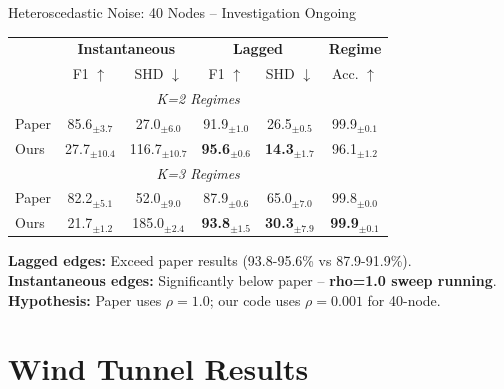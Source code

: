 \documentclass[aspectratio=169]{beamer}
\begin{document}
\begin{frame}{Heteroscedastic Noise: 40 Nodes -- \textcolor{warnred}{Investigation Ongoing}}
\begin{table}
\centering
\small
\begin{tabular}{l|cc|cc|c}
\toprule
& \multicolumn{2}{c|}{\textbf{Instantaneous}} & \multicolumn{2}{c|}{\textbf{Lagged}} & \textbf{Regime} \\
& F1 $\uparrow$ & SHD $\downarrow$ & F1 $\uparrow$ & SHD $\downarrow$ & Acc. $\uparrow$ \\
\midrule
\multicolumn{6}{c}{\textit{K=2 Regimes}} \\
\midrule
\rowcolor{lightgray} Paper & 85.6$_{\pm3.7}$ & 27.0$_{\pm6.0}$ & 91.9$_{\pm1.0}$ & 26.5$_{\pm0.5}$ & 99.9$_{\pm0.1}$ \\
Ours & \textcolor{warnred}{27.7$_{\pm10.4}$} & \textcolor{warnred}{116.7$_{\pm10.7}$} & \textcolor{reprogreen}{\textbf{95.6}$_{\pm0.6}$} & \textcolor{reprogreen}{\textbf{14.3}$_{\pm1.7}$} & 96.1$_{\pm1.2}$ \\
\midrule
\multicolumn{6}{c}{\textit{K=3 Regimes}} \\
\midrule
\rowcolor{lightgray} Paper & 82.2$_{\pm5.1}$ & 52.0$_{\pm9.0}$ & 87.9$_{\pm0.6}$ & 65.0$_{\pm7.0}$ & 99.8$_{\pm0.0}$ \\
Ours & \textcolor{warnred}{21.7$_{\pm1.2}$} & \textcolor{warnred}{185.0$_{\pm2.4}$} & \textcolor{reprogreen}{\textbf{93.8}$_{\pm1.5}$} & \textcolor{reprogreen}{\textbf{30.3}$_{\pm7.9}$} & \textcolor{reprogreen}{\textbf{99.9}$_{\pm0.1}$} \\
\bottomrule
\end{tabular}
\end{table}

\vspace{0.3cm}
\textcolor{reprogreen}{\textbf{Lagged edges:}} Exceed paper results (93.8-95.6\% vs 87.9-91.9\%). \\
\textcolor{warnred}{\textbf{Instantaneous edges:}} Significantly below paper -- \textbf{rho=1.0 sweep running}. \\
\textbf{Hypothesis:} Paper uses $\rho=1.0$; our code uses $\rho=0.001$ for 40-node.
\end{frame}

\section{Wind Tunnel Results}
\end{document}
